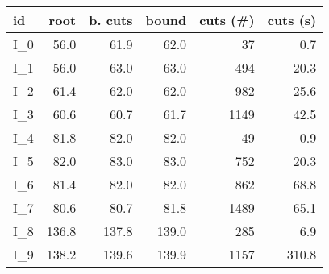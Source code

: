 \begin{tabular}{lrrrrr}
\toprule
   id &  root &  b. cuts &  bound &  cuts (\#) &  cuts (s) \\
\midrule
 I\_0 &  56.0 &     61.9 &   62.0 &         37 &       0.7 \\
 I\_1 &  56.0 &     63.0 &   63.0 &        494 &      20.3 \\
 I\_2 &  61.4 &     62.0 &   62.0 &        982 &      25.6 \\
 I\_3 &  60.6 &     60.7 &   61.7 &       1149 &      42.5 \\
 I\_4 &  81.8 &     82.0 &   82.0 &         49 &       0.9 \\
 I\_5 &  82.0 &     83.0 &   83.0 &        752 &      20.3 \\
 I\_6 &  81.4 &     82.0 &   82.0 &        862 &      68.8 \\
 I\_7 &  80.6 &     80.7 &   81.8 &       1489 &      65.1 \\
 I\_8 & 136.8 &    137.8 &  139.0 &        285 &       6.9 \\
 I\_9 & 138.2 &    139.6 &  139.9 &       1157 &     310.8 \\
\bottomrule
\end{tabular}
